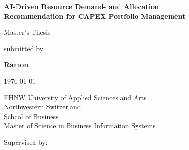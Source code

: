 \documentclass[12pt, a4paper, twoside]{report}
\begin{document}
\begin{titlepage}
  \centering
  \vspace*{2cm}

  {\LARGE\bfseries AI-Driven Resource Demand- and Allocation\\[0.5em]
  Recommendation for CAPEX Portfolio Management\par}

  \vspace{2cm}

  {\large Master's Thesis\par}

  \vspace{1cm}

  {\large submitted by\par}
  \vspace{0.5cm}
  {\Large\bfseries Ramon\par}

  \vfill

  {\large \today\par}

  \vspace{1cm}

  {\large FHNW University of Applied Sciences and Arts\\
  Northwestern Switzerland\\[0.3em]
  School of Business\\[0.3em]
  Master of Science in Business Information Systems\par}

  \vspace{1cm}

  {\small Supervised by:\\
  \par}
\end{titlepage}





\clearpage
\tableofcontents
\clearpage
\listoffigures
\clearpage
\listoftables



\clearpage
{}











\clearpage



\begin{appendices}
  
\end{appendices}
\end{document}
